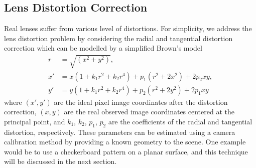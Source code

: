 \subsection{Lens Distortion Correction}
Real lenses suffer from various level of distortions. For simplicity, we address the lens distortion problem by considering 
the radial and tangential distortion correction which can be modelled by a simplified Brown's 
model~\cite{brown1966decentering}
\begin{equation}
\begin{split}
r &= \sqrt{(x^2+y^2)}, \\
x' &= x(1+k_1 r^2+k_2 r^4)+p_1(r^2+2x^2)+2p_2xy, \\
y' &= y(1+k_1 r^2+k_2 r^4)+p_2(r^2+2y^2)+2p_1xy
\label{eq_lens_distortion}
\end{split}
\end{equation}
where $(x', y')$ are the ideal pixel image coordinates after the distortion correction, $(x, y)$ are the 
real observed image coordinates centered at the principal point, and $k_{1}$, $k_{2}$, $p_1$, 
$p_2$ are the coefficients of the radial and tangential distortion, respectively.  These parameters 
can be estimated using a camera calibration method by providing a known geometry to the scene. 
One example would be to use a checkerboard pattern on a planar surface, and this technique will 
be discussed in the next section.

